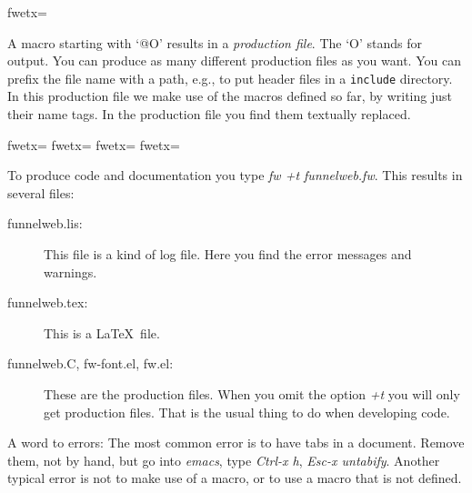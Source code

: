 \documentclass[]{article}
\begin{document}
\fwbeginmacro
{}\fwequals \fwodef {}fwetx=%
\fwcdef 
\fwbeginmacronotes
{}
\fwendmacronotes
\fwendmacro



A macro starting with `@O' results in a {\em production file}. The
`O' stands for output. You can produce as many different production
files as you want. You can prefix the file name with a path, e.g., to
put header files in a {\tt include} directory. In this production
file we make use of the macros defined so far, by writing just their
name tags. In the production file you find them textually replaced.

\fwbeginmacro
{}\fwequals \fwodef \fwbtx[
]fwetx=%
\fwbtx[

]fwetx=%
\fwbtx[

]fwetx=%
fwetx=%
\fwcdef 
\fwbeginmacronotes
{}
\fwendmacronotes
\fwendmacro



To produce code and documentation you type {\it fw +t funnelweb.fw}.
This results in several files:

\begin{description}
\item[funnelweb.lis:] This file is a kind of log file. Here you find
the error messages and warnings.

\item[funnelweb.tex:] This is a \LaTeX\ file.

\item[funnelweb.C, fw-font.el, fw.el:] These are the production files.
When you omit the option {\it +t} you will only get production files.
That is the usual thing to do when developing code.
\end{description}

A word to errors: The most common error is to have tabs in a document.
Remove them, not by hand, but go into {\it emacs}, type {\it Ctrl-x h},
{\it Esc-x untabify}. Another typical error is not to make use of a macro,
or to use a macro that is not defined.
\end{document}
